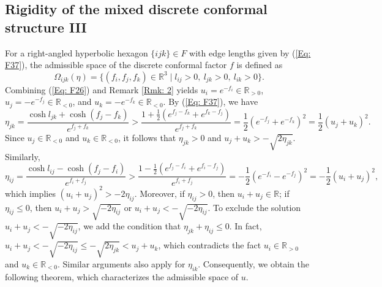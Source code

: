 \documentclass[12pt]{amsart}
\theoremstyle{definition}
\begin{document}
\subsection{Rigidity of the mixed discrete conformal structure III}

For a right-angled hyperbolic hexagon $\{ijk\}\in F$ with edge lengths given by (\ref{Eq: F37}),
the admissible space of the discrete conformal factor $f$ is defined as
\begin{equation*}
\Omega_{ijk}(\eta)=\{(f_i,f_j,f_k)\in \mathbb{R}^3 \mid l_{ij}>0,\  l_{jk}>0,\ l_{ik}>0\}.
\end{equation*}
Combining (\ref{Eq: F26}) and Remark \ref{Rmk: 2} yields $u_i=e^{-f_i}\in \mathbb{R}_{>0}$, $u_j=-e^{-f_j}\in \mathbb{R}_{<0}$, and $u_k=-e^{-f_k}\in \mathbb{R}_{<0}$.
By (\ref{Eq: F37}), we have
\begin{equation*}
\eta_{jk}=\frac{\cosh l_{jk}+\cosh(f_j-f_k)}{e^{f_j+f_k}}
>\frac{1+\frac{1}{2}(e^{f_j-f_k}+e^{f_k-f_j})}{e^{f_j+f_k}}
=\frac{1}{2}(e^{-f_j}+e^{-f_k})^2
=\frac{1}{2}(u_j+u_k)^2.
\end{equation*}
Since $u_j\in \mathbb{R}_{<0}$ and $u_k\in \mathbb{R}_{<0}$, it follows that
$\eta_{jk}>0$ and $u_j+u_k>-\sqrt{2\eta_{jk}}$.
Similarly,
\begin{equation*}
\eta_{ij}=\frac{\cosh l_{ij}-\cosh(f_j-f_i)}{e^{f_i+f_j}}
>\frac{1-\frac{1}{2}(e^{f_j-f_i}+e^{f_i-f_j})}{e^{f_i+f_j}}
=-\frac{1}{2}(e^{-f_i}-e^{-f_j})^2=-\frac{1}{2}(u_i+u_j)^2,
\end{equation*}
which implies $(u_i+u_j)^2>-2\eta_{ij}$.
Moreover, if $\eta_{ij}>0$, then $u_i+u_j\in \mathbb{R}$;
if $\eta_{ij}\leq0$, then $u_i+u_j>\sqrt{-2\eta_{ij}}$ or $u_i+u_j<-\sqrt{-2\eta_{ij}}$.
To exclude the solution $u_i+u_j<-\sqrt{-2\eta_{ij}}$,
we add the condition that $\eta_{jk}+\eta_{ij}\leq0$.
In fact, $u_i+u_j<-\sqrt{-2\eta_{ij}}
\leq-\sqrt{2\eta_{jk}}<u_j+u_k$,
which contradicts the fact $u_i\in \mathbb{R}_{>0}$ and $u_k\in \mathbb{R}_{<0}$.
Similar arguments also apply for $\eta_{ik}$.
Consequently, we obtain the following theorem, which characterizes the admissible space of $u$.
\end{document}
